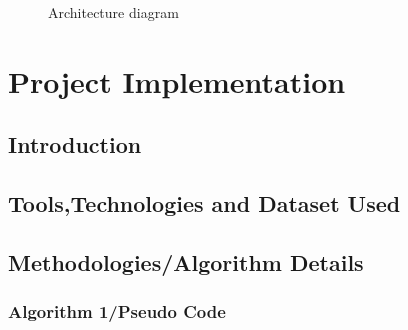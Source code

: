 \documentclass[12pt,a4paper]{article}
\begin{document}
 
  \begin{center}
	\begin{figure}[!htbp]
		\centering
	  \caption{Architecture diagram}
	  \label{fig:arch-dig}
	\end{figure}
\end{center} 

\section{Project Implementation}
\setcounter{section}{9}

  \subsection{Introduction}
  \subsection{Tools,Technologies and Dataset Used}
  \subsection{Methodologies/Algorithm Details}
  \subsubsection{Algorithm 1/Pseudo Code}
\end{document}

